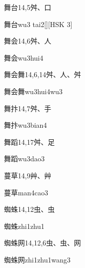 \begin{entry}{舞台}{14,5}{⾇、⼝}
  \begin{phonetics}{舞台}{wu3 tai2}[][HSK 3]
  \end{phonetics}
\end{entry}

\begin{entry}{舞会}{14,6}{⾇、⼈}
  \begin{phonetics}{舞会}{wu3hui4}
  \end{phonetics}
\end{entry}

\begin{entry}{舞会舞}{14,6,14}{⾇、⼈、⾇}
  \begin{phonetics}{舞会舞}{wu3hui4wu3}
  \end{phonetics}
\end{entry}

\begin{entry}{舞抃}{14,7}{⾇、⼿}
  \begin{phonetics}{舞抃}{wu3bian4}
  \end{phonetics}
\end{entry}

\begin{entry}{舞蹈}{14,17}{⾇、⾜}
  \begin{phonetics}{舞蹈}{wu3dao3}
  \end{phonetics}
\end{entry}

\begin{entry}{蔓草}{14,9}{⾋、⾋}
  \begin{phonetics}{蔓草}{man4cao3}
  \end{phonetics}
\end{entry}

\begin{entry}{蜘蛛}{14,12}{⾍、⾍}
  \begin{phonetics}{蜘蛛}{zhi1zhu1}
  \end{phonetics}
\end{entry}

\begin{entry}{蜘蛛网}{14,12,6}{⾍、⾍、⽹}
  \begin{phonetics}{蜘蛛网}{zhi1zhu1wang3}
  \end{phonetics}
\end{entry}

